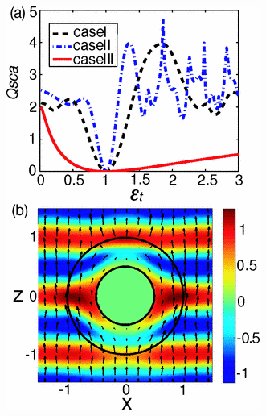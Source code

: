 \documentclass[a4paper, 12pt]{article}
\begin{document}
\begin{figure}[h]
  \centering
  \includegraphics[height=0.4\paperheight]{fig4.png}
  \caption{}
  \label{fig:4}
\end{figure}
\end{document}
